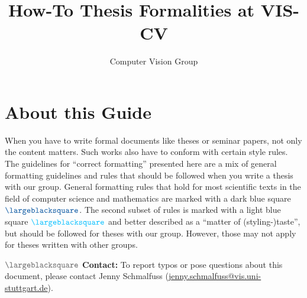 \documentclass[journal]{vgtc}
\author{Computer Vision Group}
\title{How-To Thesis Formalities at VIS-CV}
\newcommand{\lightgreysq}[1]{$\color{CD04}\largeblacksquare$ \textbf{#1:}}
\begin{document}
\setlength{\parindent}{0pt}
\setlength{\parskip}{0.5\baselineskip}



\invisiblelocaltableofcontents \label{toc:overview}

\maketitle
\section*{About this Guide}

When you have to write formal documents like theses or seminar papers, not only the content matters.
Such works also have to conform with certain style rules.
The guidelines for \enquote{correct formatting} presented here are a mix of general formatting guidelines and rules that should be followed when you write a thesis with our group.
General formatting rules that hold for most scientific texts in the field of computer science and mathematics are marked with a dark blue square $\color{CD02}\largeblacksquare$.
The second subset of rules is marked with a light blue square $\color{CD03}\largeblacksquare$ and better described as a \enquote{matter of (styling-)taste}, but should be followed for theses with our group.
However, those may not apply for theses written with other groups.

\lightgreysq{Contact} To report typos or pose questions about this document, please contact Jenny Schmalfuss (\href{mailto:jenny.schmalfuss@vis.uni-stuttgart.de}{jenny.schmalfuss@vis.uni-stuttgart.de}).

\begingroup\parindent 0pt \parfillskip 0pt \leftskip 0cm \rightskip 1cm
    {}
    {\leavevmode\leftskip 0.5cm\relax}
    {\normalsize\makebox[0.5cm][l]{\etocnumber}%
    \etocname\nobreak{\color{gray}\dotfill\phantom{\etocpage}}\nobreak%
    \rlap{\makebox[-0.1cm]{\mdseries\etocpage}}\par\vspace*{-0.4\baselineskip}}
    {}
\tableofcontents
\endgroup
%
%
\end{document}
